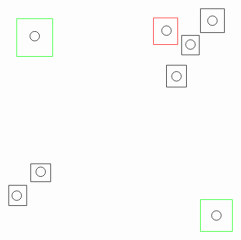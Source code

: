 \documentclass[12pt, a4paper]{article}
\begin{document}
\[\begin{tikzpicture}
\begin{scope}[yshift=-9cm, xshift=7.5cm]
        \draw (2.5, 2.5) circle (0.12);
        \draw (1.35, 2.25) circle (0.12);
        \draw (1.6, 1.1) circle (0.12);
        \draw (1.95, 1.9) circle (0.12);
        \draw (-2.4, -1.9) circle (0.12);
        \draw (-1.8, -1.3) circle (0.12);
        \draw (-1.95, 2.11) circle (0.12);
        \draw (2.6, -2.4) circle (0.12);
        
        \draw (-2.6, -2.15) rectangle (-2.15, -1.64);
        \draw (-2.05, -1.55) rectangle (-1.55, -1.1);
        \draw[green] (2.2, -2.8) rectangle (3, -2);
        \draw (2.2, 2.2) rectangle (2.8, 2.8);
        \draw[red] (1.023, 1.9) rectangle (1.63, 2.57);
        \draw (1.73, 1.64) rectangle (2.17, 2.13);
        \draw (1.35, 0.83) rectangle (1.85, 1.38);
        \draw[green] (-2.4, 1.6) rectangle (-1.5, 2.55);
    \end{scope}
\end{tikzpicture}
\]
\end{document}
